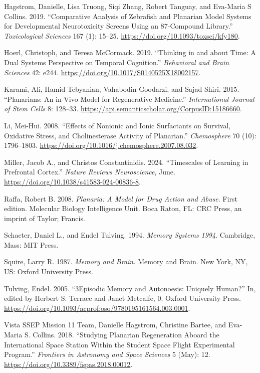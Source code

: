 \documentclass[
  letterpaper,
  DIV=11,
  numbers=noendperiod,
  oneside]{scrartcl}
\newlength{\cslhangindent}
\newenvironment{CSLReferences}[2] %
 {\begin{list}{}{%
  \setlength{\itemindent}{0pt}
  \setlength{\leftmargin}{0pt}
  \setlength{\parsep}{0pt}
  \ifodd #1
   \setlength{\leftmargin}{\cslhangindent}
   \setlength{\itemindent}{-1\cslhangindent}
  \fi
  \setlength{\itemsep}{#2\baselineskip}}}
 {\end{list}}
\begin{document}
\begin{CSLReferences}{1}{0}
Hagstrom, Danielle, Lisa Truong, Siqi Zhang, Robert Tanguay, and
Eva-Maria S Collins. 2019. {``Comparative Analysis of Zebrafish and
Planarian Model Systems for Developmental Neurotoxicity Screens Using an
87-Compound Library.''} \emph{Toxicological Sciences} 167 (1): 15--25.
\url{https://doi.org/10.1093/toxsci/kfy180}.

Hoerl, Christoph, and Teresa McCormack. 2019. {``Thinking in and about
Time: A Dual Systems Perspective on Temporal Cognition.''}
\emph{Behavioral and Brain Sciences} 42: e244.
\url{https://doi.org/10.1017/S0140525X18002157}.

Karami, Ali, Hamid Tebyanian, Vahabodin Goodarzi, and Sajad Shiri. 2015.
{``Planarians: An in Vivo Model for Regenerative Medicine.''}
\emph{International Journal of Stem Cells} 8: 128--33.
\url{https://api.semanticscholar.org/CorpusID:15186660}.

Li, Mei-Hui. 2008. {``Effects of Nonionic and Ionic Surfactants on
Survival, Oxidative Stress, and Cholinesterase Activity of Planarian.''}
\emph{Chemosphere} 70 (10): 1796--1803.
\url{https://doi.org/10.1016/j.chemosphere.2007.08.032}.

Miller, Jacob A., and Christos Constantinidis. 2024. {``Timescales of
Learning in Prefrontal Cortex.''} \emph{Nature Reviews Neuroscience},
June. \url{https://doi.org/10.1038/s41583-024-00836-8}.

Raffa, Robert B. 2008. \emph{Planaria: A Model for Drug Action and
Abuse}. First edition. Molecular Biology Intelligence Unit. Boca Raton,
FL: CRC Press, an imprint of Taylor; Francis.

Schacter, Daniel L., and Endel Tulving. 1994. \emph{Memory Systems
1994}. Cambridge, Mass: MIT Press.

Squire, Larry R. 1987. \emph{Memory and Brain.} Memory and Brain. New
York, NY, US: Oxford University Press.

Tulving, Endel. 2005. {``3Episodic Memory and Autonoesis: Uniquely
Human?''} In, edited by Herbert S. Terrace and Janet Metcalfe, 0. Oxford
University Press.
\url{https://doi.org/10.1093/acprof:oso/9780195161564.003.0001}.

Vista SSEP Mission 11 Team, Danielle Hagstrom, Christine Bartee, and
Eva-Maria S. Collins. 2018. {``Studying Planarian Regeneration Aboard
the International Space Station Within the Student Space Flight
Experimental Program.''} \emph{Frontiers in Astronomy and Space
Sciences} 5 (May): 12. \url{https://doi.org/10.3389/fspas.2018.00012}.

\end{CSLReferences}
\end{document}

